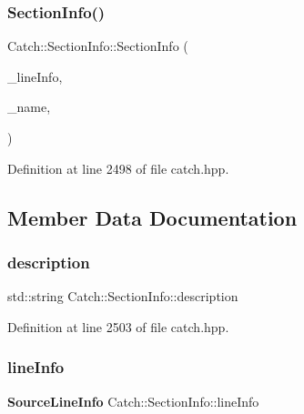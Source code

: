 \mbox{\label{struct_catch_1_1_section_info_a139875f2e7bd12a5898a948f8bad15b3}} 
\subsubsection{SectionInfo()\hspace{0.1cm}{\footnotesize\ttfamily [2/2]}}
{\footnotesize\ttfamily Catch\+::\+Section\+Info\+::\+Section\+Info (\begin{DoxyParamCaption}\item[{\textbf{ Source\+Line\+Info} const \&}]{\+\_\+line\+Info,  }\item[{std\+::string const \&}]{\+\_\+name,  }\item[{std\+::string const \&}]{ }\end{DoxyParamCaption})\hspace{0.3cm}{\ttfamily [inline]}}



Definition at line 2498 of file catch.\+hpp.



\subsection{Member Data Documentation}
\mbox{\label{struct_catch_1_1_section_info_a0052060219a6de74bb7ade34d4163a4e}} 
\subsubsection{description}
{\footnotesize\ttfamily std\+::string Catch\+::\+Section\+Info\+::description}



Definition at line 2503 of file catch.\+hpp.

\mbox{\label{struct_catch_1_1_section_info_adbc83b8a3507c4acc8ee249e93465711}} 
\subsubsection{lineInfo}
{\footnotesize\ttfamily \textbf{ Source\+Line\+Info} Catch\+::\+Section\+Info\+::line\+Info}



